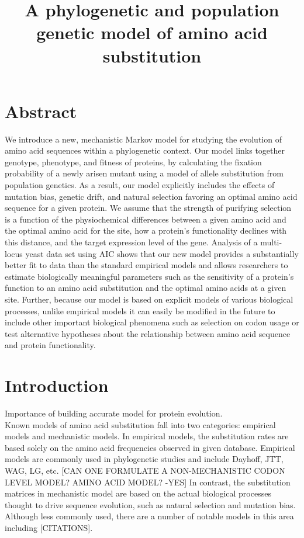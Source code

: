 \documentclass[13pt]{article}
\title{A phylogenetic and population genetic model of amino acid substitution}
\author{}
\begin{document}
\maketitle
\section{Abstract}
We introduce a new, mechanistic Markov model for studying the evolution of amino acid sequences within a phylogenetic context.
Our model links together genotype, phenotype, and fitness of proteins, by calculating the fixation probability of a newly arisen mutant using a model of allele substitution from population genetics. 
As a result, our model explicitly includes the effects of mutation bias, genetic drift, and natural selection favoring an optimal amino acid sequence for a given protein.
We assume that the strength of purifying selection is a function of the physiochemical differences between a given amino acid and the optimal amino acid for the site, how a protein's functionality declines with this distance, and the target expression level of the gene.
Analysis of a multi-locus yeast data set using AIC shows that our new model provides a substantially better fit to data than the standard empirical models and allows researchers to estimate biologically meaningful parameters such as the sensitivity of a protein's function to an amino acid substitution and the optimal amino acids at a given site.
Further, because our model is based on explicit models of various biological processes, unlike empirical models it can easily be modified in the future to include other important biological phenomena such as selection on codon usage or test alternative hypotheses about the relationship between amino acid sequence and protein functionality.


\section{Introduction}
Importance of building accurate model for protein evolution. \\

Known models of amino acid substitution fall into two categories: empirical models and mechanistic models. 
In empirical models, the substitution rates are based solely on the amino acid frequencies observed in given database.
Empirical models are commonly used in phylogenetic studies and include  Dayhoff, JTT, WAG, LG, etc. 
[CAN ONE FORMULATE A NON-MECHANISTIC CODON LEVEL MODEL? AMINO ACID MODEL?  -YES]
In contrast, the substitution matrices in mechanistic model are based on the actual biological processes thought to drive sequence evolution, such as natural selection and mutation bias.
Although less commonly used, there are a number of notable models in this area including [CITATIONS].
\end{document}
